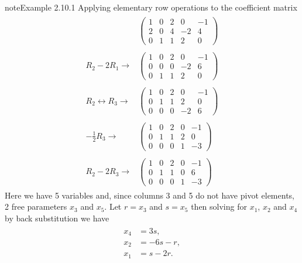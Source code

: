 \documentclass[letterpaper,10pt,english]{jupyterBook}
\begin{document}
\begin{sphinxadmonition}{note}{Example 2.10.1}
\sphinxAtStartPar
Applying elementary row operations to the coefficient matrix
\begin{equation*}
\begin{split} \begin{align*}
    & \left( \begin{array}{ccccc}
        1 & 0 & 2 & 0 & -1 \\
        2 & 0 & 4 & -2 & 4 \\
        0 & 1 & 1 & 2 & 0
    \end{array} \right)
	\\ \\
    R_2 - 2R_1 \longrightarrow &
    \left( \begin{array}{ccccc}
        1 & 0 & 2 & 0 & -1 \\
        0 & 0 & 0 & -2 & 6 \\
        0 & 1 & 1 & 2 & 0
    \end{array} \right)
    \\ \\
    R_2 \leftrightarrow R_3 \longrightarrow &
    \left( \begin{array}{ccccc}
        1 & 0 & 2 & 0 & -1 \\
        0 & 1 & 1 & 2 & 0 \\
        0 & 0 & 0 & -2 & 6
    \end{array} \right)
    \\ \\
    -\frac{1}{2} R_3 \longrightarrow &
    \left( \begin{array}{ccccc}
        1 & 0 & 2 & 0 & -1 \\
        0 & 1 & 1 & 2 & 0 \\
        0 & 0 & 0 & 1 & -3
    \end{array} \right)
	\\ \\
    R_2 - 2R_3  \longrightarrow &
    \left( \begin{array}{ccccc}
        1 & 0 & 2 & 0 & -1 \\
        0 & 1 & 1 & 0 & 6 \\
        0 & 0 & 0 & 1 & -3
    \end{array} \right)
\end{align*} \end{split}
\end{equation*}
\sphinxAtStartPar
Here we have 5 variables and, since columns 3 and 5 do not have pivot elements, 2 free parameters \(x_3\) and \(x_5\). Let \(r = x_3 \) and \(s = x_5\) then solving for \(x_1\), \(x_2\) and \(x_4\) by back substitution we have
\begin{equation*}
\begin{split} \begin{align*}
    x_4 &= 3s, \\
    x_2 &= -6s - r, \\
    x_1 &= s - 2r.
\end{align*} \end{split}
\end{equation*}\end{sphinxadmonition}
\end{document}

